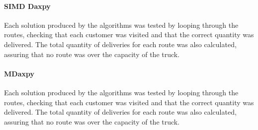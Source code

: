 \documentclass[conference]{acmsiggraph}
\begin{document}
\paragraph{SIMD Daxpy}
Each solution produced by the algorithms was tested by looping through the routes, checking that each customer was visited and that the correct quantity was delivered. The total quantity of deliveries for each route was also calculated, assuring that no route was over the capacity of the truck.

\paragraph{MDaxpy}
Each solution produced by the algorithms was tested by looping through the routes, checking that each customer was visited and that the correct quantity was delivered. The total quantity of deliveries for each route was also calculated, assuring that no route was over the capacity of the truck.

\afterpage{\clearpage}
\end{document}
